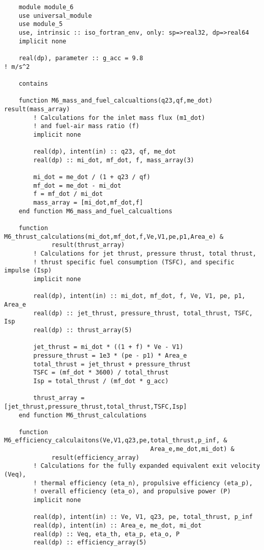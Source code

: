 \begin{verbatim}
    module module_6
    use universal_module
    use module_5
    use, intrinsic :: iso_fortran_env, only: sp=>real32, dp=>real64
    implicit none

    real(dp), parameter :: g_acc = 9.8                                   ! m/s^2

    contains

    function M6_mass_and_fuel_calcualtions(q23,qf,me_dot) result(mass_array)
        ! Calculations for the inlet mass flux (m1_dot)
        ! and fuel-air mass ratio (f)
        implicit none

        real(dp), intent(in) :: q23, qf, me_dot
        real(dp) :: mi_dot, mf_dot, f, mass_array(3)

        mi_dot = me_dot / (1 + q23 / qf)
        mf_dot = me_dot - mi_dot
        f = mf_dot / mi_dot
        mass_array = [mi_dot,mf_dot,f]
    end function M6_mass_and_fuel_calcualtions

    function M6_thrust_calculations(mi_dot,mf_dot,f,Ve,V1,pe,p1,Area_e) &
             result(thrust_array)
        ! Calculations for jet thrust, pressure thrust, total thrust,
        ! thrust specific fuel consumption (TSFC), and specific impulse (Isp)
        implicit none

        real(dp), intent(in) :: mi_dot, mf_dot, f, Ve, V1, pe, p1, Area_e
        real(dp) :: jet_thrust, pressure_thrust, total_thrust, TSFC, Isp
        real(dp) :: thrust_array(5)

        jet_thrust = mi_dot * ((1 + f) * Ve - V1)
        pressure_thrust = 1e3 * (pe - p1) * Area_e
        total_thrust = jet_thrust + pressure_thrust
        TSFC = (mf_dot * 3600) / total_thrust
        Isp = total_thrust / (mf_dot * g_acc)

        thrust_array = [jet_thrust,pressure_thrust,total_thrust,TSFC,Isp]
    end function M6_thrust_calculations

    function M6_efficiency_calculaitons(Ve,V1,q23,pe,total_thrust,p_inf, &
                                        Area_e,me_dot,mi_dot) &
             result(efficiency_array)
        ! Calculations for the fully expanded equivalent exit velocity (Veq),
        ! thermal efficiency (eta_n), propulsive efficiency (eta_p),
        ! overall efficiency (eta_o), and propulsive power (P)
        implicit none

        real(dp), intent(in) :: Ve, V1, q23, pe, total_thrust, p_inf
        real(dp), intent(in) :: Area_e, me_dot, mi_dot
        real(dp) :: Veq, eta_th, eta_p, eta_o, P
        real(dp) :: efficiency_array(5)


\end{verbatim}
